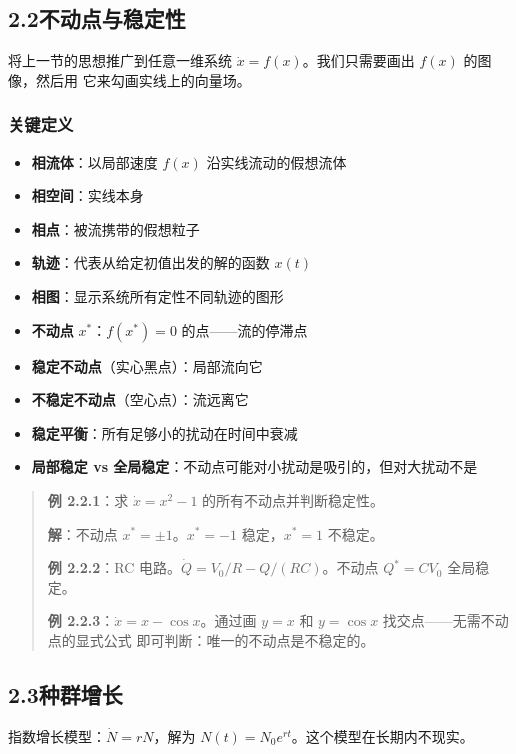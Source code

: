 \documentclass[12pt,a4paper]{article}
\begin{document}
\subsection{2.2\quad 不动点与稳定性}

将上一节的思想推广到任意一维系统 $\dot{x} = f(x)$。我们只需要画出 $f(x)$ 的图像，然后用
它来勾画实线上的向量场。

\subsubsection{关键定义}
\begin{itemize}[nosep]
  \item \textbf{相流体}：以局部速度 $f(x)$ 沿实线流动的假想流体
  \item \textbf{相空间}：实线本身
  \item \textbf{相点}：被流携带的假想粒子
  \item \textbf{轨迹}：代表从给定初值出发的解的函数 $x(t)$
  \item \textbf{相图}：显示系统所有定性不同轨迹的图形
  \item \textbf{不动点} $x^*$：$f(x^*) = 0$ 的点——流的停滞点
  \item \textbf{稳定不动点}（实心黑点）：局部流向它
  \item \textbf{不稳定不动点}（空心点）：流远离它
  \item \textbf{稳定平衡}：所有足够小的扰动在时间中衰减
  \item \textbf{局部稳定 vs 全局稳定}：不动点可能对小扰动是吸引的，但对大扰动不是
\end{itemize}

\begin{quote}
\textbf{例 2.2.1}：求 $\dot{x} = x^2 - 1$ 的所有不动点并判断稳定性。

\textbf{解}：不动点 $x^* = \pm 1$。$x^* = -1$ 稳定，$x^* = 1$ 不稳定。

\medskip
\textbf{例 2.2.2}：RC 电路。$\dot{Q} = V_0/R - Q/(RC)$。不动点 $Q^* = CV_0$ 全局稳定。

\medskip
\textbf{例 2.2.3}：$\dot{x} = x - \cos x$。通过画 $y = x$ 和 $y = \cos x$ 找交点——无需不动点的显式公式
即可判断：唯一的不动点是不稳定的。
\end{quote}

\subsection{2.3\quad 种群增长}

指数增长模型：$\dot{N} = rN$，解为 $N(t) = N_0 e^{rt}$。这个模型在长期内不现实。
\end{document}
